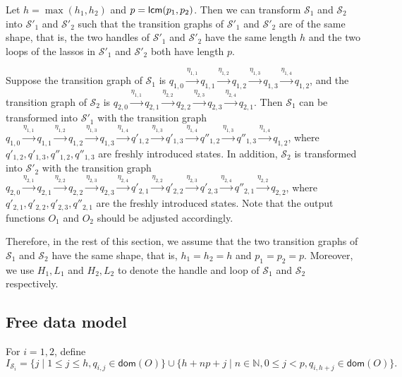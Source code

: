 \documentclass[runningheads,a4paper]{llncs}
\newcommand\dom{\mathsf{dom}}
\newcommand\nat{\mathbb{N}}
\newcommand\Ss{\mathcal{S}}
\begin{document}
Let $h=\max(h_1,h_2)$ and $p = {\sf lcm}(p_1, p_2)$. Then we can transform $\Ss_1$ and $\Ss_2$ into $\Ss'_1$ and $\Ss'_2$ such that the transition graphs of $\Ss'_1$ and $\Ss'_2$ are of the same shape, that is, the two handles of $\Ss'_1$ and $\Ss'_2$ have the same length $h$ and the two loops of the lassos in $\Ss'_1$ and $\Ss'_2$ both have length $p$.

\begin{example}
Suppose the transition graph of $\Ss_1$ is $q_{1,0} \xrightarrow{\eta_{1,1}} q_{1, 1}  \xrightarrow{\eta_{1,2}} q_{1, 2} \xrightarrow{\eta_{1, 3}} q_{1, 3} \xrightarrow{\eta_{1, 4}} q_{1, 2}$, and the transition graph of $\Ss_2$ is 
$q_{2,0} \xrightarrow{\eta_{1,1}} q_{2, 1}  \xrightarrow{\eta_{2,2}} q_{2, 2} \xrightarrow{\eta_{2, 3}} q_{2, 3} \xrightarrow{\eta_{2, 4}} q_{2, 1}$. Then $\Ss_1$ can be transformed into $\Ss'_1$ with the transition graph $q_{1,0} \xrightarrow{\eta_{1,1}} q_{1, 1}  \xrightarrow{\eta_{1,2}} q_{1, 2} \xrightarrow{\eta_{1, 3}} q_{1, 3} \xrightarrow{\eta_{1, 4}} q'_{1, 2} \xrightarrow{\eta_{1, 3}} q'_{1, 3} \xrightarrow{\eta_{1, 4}} q''_{1, 2}  \xrightarrow{\eta_{1, 3}} q''_{1, 3} \xrightarrow{\eta_{1, 4}} q_{1, 2}$, where $q'_{1,2}, q'_{1, 3}, q''_{1, 2}, q''_{1, 3}$ are freshly introduced states. In addition, $\Ss_2$ is transformed into $\Ss'_2$ with the transition graph $q_{2,0} \xrightarrow{\eta_{2,1}} q_{2, 1}  \xrightarrow{\eta_{2,2}} q_{2, 2} \xrightarrow{\eta_{2, 3}} q_{2, 3} \xrightarrow{\eta_{2, 4}} q'_{2, 1} \xrightarrow{\eta_{2, 2}} q'_{2, 2} \xrightarrow{\eta_{2, 3}} q'_{2, 3}  \xrightarrow{\eta_{2, 4}} q''_{2, 1} \xrightarrow{\eta_{2, 2}} q_{2, 2}$, where $q'_{2,1}, q'_{2,2}, q'_{2,3}, q''_{2,1}$ are the freshly introduced states. Note that the output functions $O_1$  and $O_2$ should be adjusted accordingly.
\end{example}

Therefore, in the rest of this section, we assume that the two transition graphs of $\Ss_1$ and $\Ss_2$ have the same shape, that is, $h_1 = h_2 = h$ and $p_1 = p_2 = p$. Moreover, we use $H_1, L_1$ and $H_2,L_2$ to denote the handle and loop of $\Ss_1$ and $\Ss_2$ respectively.

\subsection{Free data model}


For $i=1,2$, define 
$$I_{\Ss_i} = \{j \mid 1 \le j \le h, q_{i,j} \in \dom(O) \} \cup \{h + n p + j \mid n \in \nat, 0 \le j < p, q_{i, h+j} \in \dom(O)\}.$$
\end{document}
